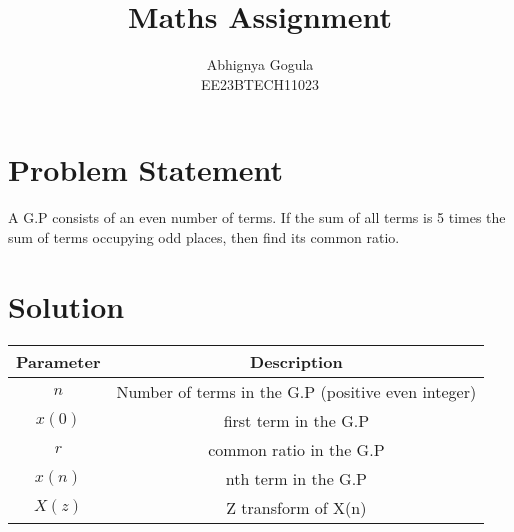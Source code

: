 \documentclass{article}
\begin{document}
\title{Maths Assignment}
\author{Abhignya Gogula\\
        EE23BTECH11023}
\maketitle

\section*{Problem Statement}
A G.P consists of an even number of terms. If the sum of all terms is 5 times the sum of terms occupying odd places, then find its common ratio.

\section*{Solution}
\begin{table}[h!]
\centering
\begin{tabular}{|c|c|}
\hline
Parameter & Description \\
\hline
\( n \) & Number of terms in the G.P (positive even integer) \\
\hline
\(x(0) \) & first term in the G.P \\
\hline
\( r \) & common ratio in the G.P \\
\hline
\( x(n) \) & nth term in the G.P \\
\hline
\( X(z) \) & Z transform of X(n) \\
\hline
\end{tabular}
\end{table}
\end{document}
